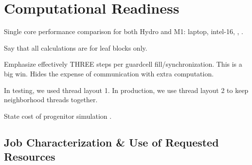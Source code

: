 \section{Computational Readiness}
\label{sec:readiness}

Single core performance comparison for both Hydro and M1: laptop, intel-16, \mira, \thet.

Say that all calculations are for leaf blocks only.

Emphasize effectively THREE steps per guardcell fill/synchronization. This is a big win. Hides the expense of communication with extra computation.

In testing, we used thread layout 1. In production, we use thread layout 2 to keep neighborhood threads together.

State cost of progenitor simulation .

\subsection{Job Characterization \& Use of Requested Resources}
\label{sec:jobs}

